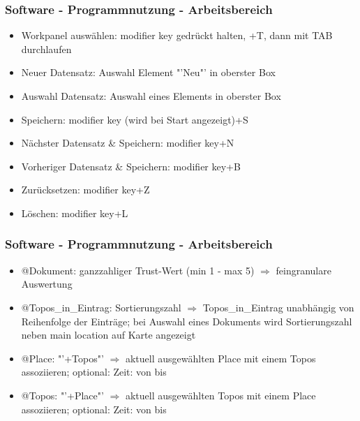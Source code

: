 \documentclass{beamer}
\begin{document}
	
\begin{frame}
			\frametitle{Software - Programmnutzung - Arbeitsbereich} 
				\begin{itemize}
					\item Workpanel auswählen: modifier key gedrückt halten, +T, dann mit TAB durchlaufen
					\item Neuer Datensatz: Auswahl Element "'Neu"' in oberster Box 
					\item Auswahl Datensatz: Auswahl eines Elements in oberster Box
					\item Speichern: modifier key (wird bei Start angezeigt)+S
					\item Nächster Datensatz \& Speichern: modifier key+N
					\item Vorheriger Datensatz \& Speichern: modifier key+B
					\item Zurücksetzen: modifier key+Z
					\item Löschen: modifier key+L
				\end{itemize}
	\end{frame}	

	\begin{frame}
			\frametitle{Software - Programmnutzung - Arbeitsbereich} 
				\begin{itemize}
					\item @Dokument: ganzzahliger Trust-Wert (min 1 - max 5) $\Rightarrow$ feingranulare Auswertung
					\item @Topos\_in\_Eintrag: Sortierungszahl $\Rightarrow$ Topos\_in\_Eintrag unabhängig von Reihenfolge der Einträge; bei Auswahl eines Dokuments wird Sortierungszahl neben main location auf Karte angezeigt
					\item @Place: "'+Topos"' $\Rightarrow$ aktuell ausgewählten Place mit einem Topos assoziieren; optional: Zeit: von bis
					\item @Topos: "'+Place"' $\Rightarrow$ aktuell ausgewählten Topos mit einem Place assoziieren; optional: Zeit: von bis
				\end{itemize}
	\end{frame}	
\end{document}
